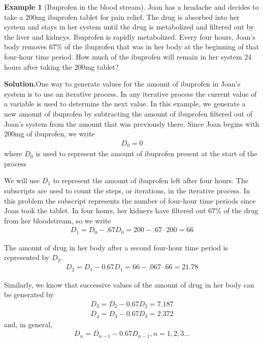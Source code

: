 \documentclass[10pt,]{book}
\theoremstyle{plain}
\theoremstyle{definition}
\newtheorem{example}[theorem]{Example}
\theoremstyle{definition}
\numberwithin{equation}{section}
\begin{document}
\begin{example}[Ibuprofen in the blood stream]\label{example-1}
Joan has a headache and decides to take a 200mg ibuprofen tablet for pain relief.  The drug is absorbed into her system and stays in her system until the drug is metabolized and filtered out by the liver and kidneys.  Ibuprofen is rapidly metabolized.  Every four hours, Joan's body removes \(67\%\) of the ibuprofen that was in her body at the beginning of that four-hour time period.  How much of the ibuprofen will remain in her system \(24\) hours after taking the \(200\)mg tablet?%
\par\medskip\noindent%
\textbf{Solution.}\quad One way to generate values for the amount of ibuprofen in Joan's system is to use an iterative process.  In any iterative process the current value of a variable is used to determine the next value.  In this example, we generate a new amount of ibuprofen by subtracting the amount of ibuprofen filtered out of Joan's system from the amount that was previously there.  Since Joan begins with 200mg of ibuprofen, we write%
\begin{gather*}
D_0=0
\end{gather*}
where \(D_0\) is used to represent the amount of ibuprofen present at the start of the process%
\par
We will use \(D_1\) to represent the amount of ibuprofen left after four hours.  The subscripts are used to count the steps, or iterations,  in the iterative process. In this problem the subscript  represents the number of four-hour time periods since Joan took the tablet.  In four hours, her kidneys have filtered out \(67\%\) of the drug from her bloodstream, so we write%
\begin{gather*}
D_1=D_0-.67D_0=200-.67\cdot 200=66
\end{gather*}
%
\par
The amount of drug in her body after a second four-hour time period is represented by \(D_2\).%
\begin{gather*}
D_2=D_1-0.67D_1=66-.067\cdot 66=21.78
\end{gather*}
%
\par
Similarly, we know that successive values of the amount of drug in her body can be generated by%
\begin{gather*}
D_3=D_2-0.67D_2=7.187\\
D_4=D_3-0.67D_3=2.372
\end{gather*}
and, in general,%
\begin{gather*}
D_n=D_{n-1}-0.67D_{n-1},n=1,2,3...

\end{gather*}
\end{example}
\end{document}
